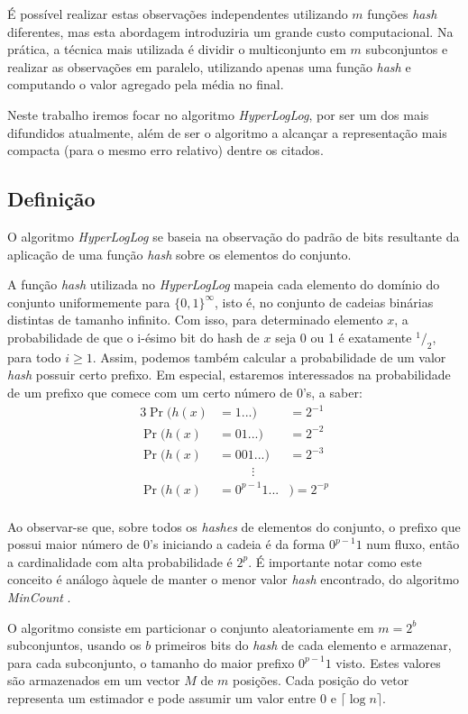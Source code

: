 É possível realizar estas observações independentes utilizando $m$ funções \emph{hash} diferentes, mas esta abordagem introduziria um grande custo computacional. Na prática, a técnica mais utilizada é dividir o multiconjunto em $m$ subconjuntos e realizar as observações em paralelo, utilizando apenas uma função \emph{hash} e computando o valor agregado pela média no final.

Neste trabalho iremos focar no algoritmo \emph{HyperLogLog}, por ser um dos mais difundidos atualmente, além de ser o algoritmo a alcançar a representação mais compacta (para o mesmo erro relativo) dentre os citados.

\subsection{Definição}

O algoritmo \emph{HyperLogLog} se baseia na observação do padrão de bits resultante da aplicação de uma função \emph{hash} sobre os elementos do conjunto. 

A função \emph{hash} utilizada no \emph{HyperLogLog} mapeia cada elemento do domínio do conjunto uniformemente para $\{0, 1\}^\infty$, isto é, no conjunto de cadeias binárias distintas de tamanho infinito. Com isso, para determinado elemento $x$, a probabilidade de que o i-ésimo bit do hash de $x$ seja 0 ou 1 é exatamente $^1/_2$, para todo $i \geq 1$. Assim, podemos também calcular a probabilidade de um valor \emph{hash} possuir certo prefixo. Em especial, estaremos interessados na probabilidade de um prefixo que comece com um certo número de 0's, a saber:
\begin{alignat*}{3}
\Pr(h(x) &= 1...) &= 2^{-1} \\
\Pr(h(x) &= 01...) &= 2^{-2} \\
\Pr(h(x) &= 001...) &= 2^{-3} \\
& \phantom{aaaaa}\vdots \\
\Pr(h(x) &= 0^{p-1}1...&) = 2^{-p} \\
\end{alignat*}

Ao observar-se que, sobre todos os \emph{hashes} de elementos do conjunto, o prefixo que possui maior número de 0's iniciando a cadeia é da forma $0^{p-1}1$ num fluxo, então a cardinalidade com alta probabilidade é $2^p$. É importante notar como este conceito é análogo àquele de manter o menor valor \emph{hash} encontrado, do algoritmo \emph{MinCount}  \cite{giroire2009order}.

O algoritmo consiste em particionar o conjunto aleatoriamente em $m = 2^b$ subconjuntos, usando os $b$ primeiros bits do \emph{hash} de cada elemento e armazenar, para cada subconjunto, o tamanho do maior prefixo $0^{p-1}1$ visto. Estes valores são armazenados em um vector $M$ de $m$ posições. Cada posição do vetor representa um estimador e pode assumir um valor entre $0$ e $\lceil \log n \rceil$.

